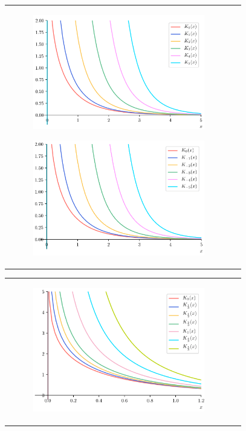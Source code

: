 \documentclass[../main/main]{subfiles}
\begin{document}
\begin{figure}[tb]
\begin{tabular}{cc}
\hspace{-24pt}
 \begin{minipage}{0.50\hsize}\small
    \begin{figure}[H]
      \centering
      \includegraphics[width=75mm]{../fig/bessel/mod_K_n.png}
    \end{figure}
 \end{minipage}

 \begin{minipage}{0.50\hsize}
    \begin{figure}[H]
      \centering
      \includegraphics[width=75mm]{../fig/bessel/mod_K_n_minus.png}
    \end{figure}
 \end{minipage}
\end{tabular}

\begin{tabular}{cc}
\hspace{-25pt}
 \begin{minipage}{0.50\hsize}
    \begin{figure}[H]
      \centering
      \includegraphics[width=75mm]{../fig/bessel/mod_K_nu.png}
    \end{figure}
 \end{minipage}


\end{tabular}
\end{figure}
\end{document}
